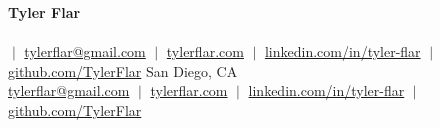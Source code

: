 \begin{center}
  \textbf{\Huge Tyler Flar} \\ \vspace{4pt}
  \ifdefined\resumeHeadline
    {\large\scshape \resumeHeadline} \\ \vspace{4pt}
  \fi
  \small
  \ifdefined\resumeCompact
    \ifdefined\resumePhone
      \href{tel:\resumePhoneTel}{\resumePhone} $\;|\;$
    \fi
    \href{mailto:tylerflar@gmail.com}{tylerflar@gmail.com}
    $\;|\;$ \href{https://tylerflar.com}{tylerflar.com}
    $\;|\;$ \href{https://linkedin.com/in/tyler-flar/}{linkedin.com/in/tyler-flar}
    $\;|\;$ \href{https://github.com/TylerFlar}{github.com/TylerFlar}
  \else
    {\large San Diego, CA} \\[2pt]
    \href{mailto:tylerflar@gmail.com}{tylerflar@gmail.com}
    $\;|\;$ \href{https://tylerflar.com}{tylerflar.com}
    $\;|\;$ \href{https://linkedin.com/in/tyler-flar/}{linkedin.com/in/tyler-flar}
    $\;|\;$ \href{https://github.com/TylerFlar}{github.com/TylerFlar}
  \fi
\end{center}
